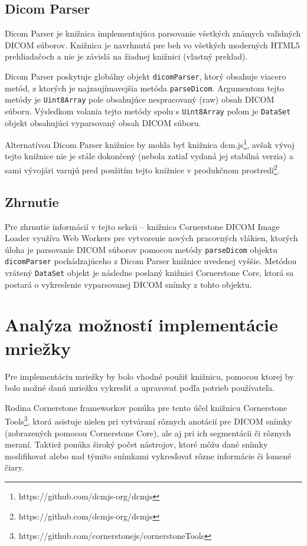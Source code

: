\subsection {Dicom Parser}
Dicom Parser je knižnica implementujúca parsovanie všetkých známych validných DICOM súborov. Knižnica je navrhnutá pre beh vo všetkých moderných HTML5 prehliadačoch a nie je závislá na žiadnej knižnici \cite{about_dicom_parser} (vlastný preklad).

Dicom Parser poskytuje globálny objekt \texttt{dicomParser}, ktorý obsahuje viacero metód, z ktorých je najzaujímavejšia metóda \texttt{parseDicom}. Argumentom tejto metódy je \texttt{Uint8Array} pole obsahujúce nespracovaný (raw) obsah DICOM súboru. Výsledkom volania tejto metódy spolu s \texttt{Uint8Array} poľom je \texttt{DataSet} objekt obsahujúci vyparsovaný obsah DICOM súboru.

\clearpage

Alternatívou Dicom Parser knižnice by mohla byť knižnica dcm.js\footnote{https://github.com/dcmjs-org/dcmjs}, avšak vývoj tejto knižnice nie je stále dokončený (nebola zatiaľ vydaná jej stabilná verzia) a sami vývojári varujú pred použitím tejto knižnice v produkčnom prostredí\footnote{https://github.com/dcmjs-org/dcmjs}.

\subsection {Zhrnutie}
Pre zhrnutie informácií v tejto sekcii -- knižnica Cornerstone DICOM Image Loader využíva Web Workers pre vytvorenie nových pracovných vlákien, ktorých úloha je parsovanie DICOM súborov pomocou metódy \texttt{parseDicom} objektu \texttt{dicomParser} pochádzajúceho z Dicom Parser knižnice uvedenej vyššie. Metódou vrátený \texttt{DataSet} objekt je následne poslaný knižnici Cornerstone Core, ktorá sa postará o vykreslenie vyparsovanej DICOM snímky z tohto objektu.

\section {Analýza možností implementácie mriežky}
Pre implementáciu mriežky by bolo vhodné použiť knižnicu, pomocou ktorej by bolo možné danú mriežku vykresliť a upravovať podľa potrieb používateľa.

Rodina Cornerstone frameworkov ponúka pre tento účel knižnicu Cornerstone Tools\footnote{https://github.com/cornerstonejs/cornerstoneTools}, ktorá asistuje nielen pri vytváraní rôznych anotácií pre DICOM snímky (zobrazených pomocou Cornerstone Core), ale aj pri ich segmentácii či rôznych meraní. Taktiež ponúka široký počet nástrojov, ktoré môžu dané snímky modifikovať alebo nad týmito snímkami vykresľovať rôzne informácie či lomené čiary.

